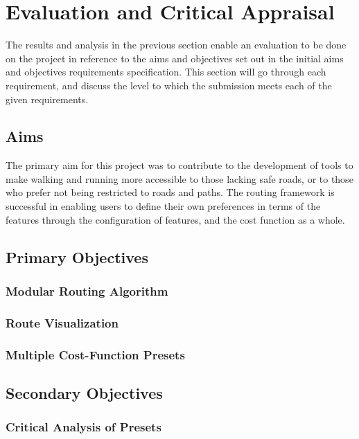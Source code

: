 \documentclass[12pt]{article}
\begin{document}
\section{Evaluation and Critical Appraisal}

The results and analysis in the previous section enable an evaluation to be done on the project in reference to the aims and objectives set out in the initial aims and objectives requirements specification. This section will go through each requirement, and discuss the level to which the submission meets each of the given requirements.

\subsection{Aims}

The primary aim for this project was to contribute to the development of tools to make walking and running more accessible to those lacking safe roads, or to those who prefer not being restricted to roads and paths. The routing framework is successful in enabling users to define their own preferences in terms of the features through the configuration of features, and the cost function as a whole.

\subsection{Primary Objectives}

\subsubsection{Modular Routing Algorithm}

\subsubsection{Route Visualization}

\subsubsection{Multiple Cost-Function Presets}

\subsection{Secondary Objectives}

\subsubsection{Critical Analysis of Presets}
\end{document}
